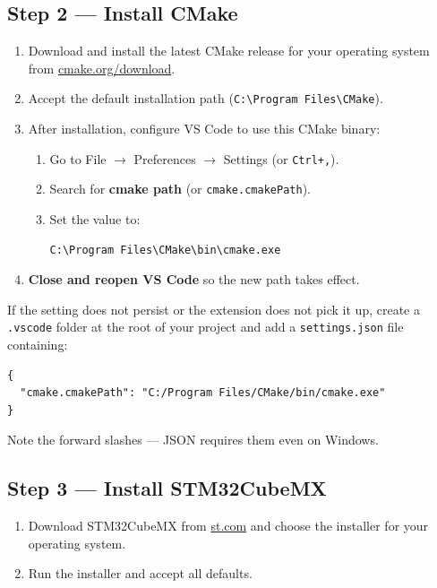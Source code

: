 \documentclass[11pt,letterpaper]{article}
\begin{document}
\subsection{Step 2 --- Install CMake}
\begin{enumerate}[leftmargin=2em]
	\item Download and install the latest CMake release for your operating system from \href{https://cmake.org/download/}{cmake.org/download}.
	\item Accept the default installation path (\texttt{C:\textbackslash Program Files\textbackslash CMake}).
	\item After installation, configure VS Code to use this CMake binary:
	\begin{enumerate}[leftmargin=1.5em]
		\item Go to File $\to$ Preferences $\to$ Settings (or \texttt{Ctrl+,}).
		\item Search for \textbf{cmake path} (or \texttt{cmake.cmakePath}).
		\item Set the value to:
\begin{verbatim}
C:\Program Files\CMake\bin\cmake.exe
\end{verbatim}
	\end{enumerate}
	\item \textbf{Close and reopen VS Code} so the new path takes effect.
\end{enumerate}

\begin{tcolorbox}[infobox={Alternate cmake.cmakePath method}]
	If the setting does not persist or the extension does not pick it up, create a \texttt{.vscode} folder at the root of your project and add a \texttt{settings.json} file containing:
\begin{verbatim}
{
  "cmake.cmakePath": "C:/Program Files/CMake/bin/cmake.exe"
}
\end{verbatim}
	Note the forward slashes --- JSON requires them even on Windows.
\end{tcolorbox}

\subsection{Step 3 --- Install STM32CubeMX}
\begin{enumerate}[leftmargin=2em]
	\item Download STM32CubeMX from \href{https://www.st.com/en/development-tools/stm32cubemx.html}{st.com} and choose the installer for your operating system.
	\item Run the installer and accept all defaults.
\end{enumerate}
\end{document}
